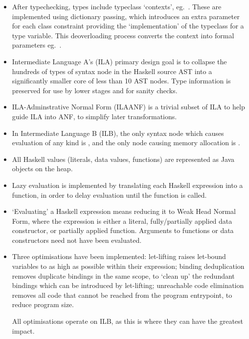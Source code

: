 \documentclass[dissertation.tex]{subfiles}
\begin{document}
{\begin{itemize}
{        Typeclasses provide a way to implement strongly-typed ad-hoc overloading, allowing for the types of overloaded expressions to be known at compile time.
    }
    \item
    {
        After typechecking, types include typeclass `contexts', eg.\ . These are implemented using dictionary passing, which introduces an extra parameter for each class constraint providing the `implementation' of the typeclass for a type variable. This deoverloading process converts the context into formal parameters eg.\ .
    }
    \item
    {
        Intermediate Language A's (ILA) primary design goal is to collapse the hundreds of types of syntax node in the Haskell source AST into a significantly smaller core of less than 10 AST nodes. Type information is preserved for use by lower stages and for sanity checks.
    }
    \item
    {
        ILA-Adminstrative Normal Form (ILAANF) is a trivial subset of ILA to help guide ILA into ANF, to simplify later transformations.
    }
    \item
    {
        In Intermediate Language B (ILB), the only syntax node which causes evaluation of any kind is , and the only node causing memory allocation is .
    }
    \item All Haskell values (literals, data values, functions) are represented as Java objects on the heap.
    \item
    {
        Lazy evaluation is implemented by translating each Haskell expression into a function, in order to delay evaluation until the function is called.
    }
    \item
    {
        `Evaluating' a Haskell expression means reducing it to Weak Head Normal Form, where the expression is either a literal, fully/partially applied data constructor, or partially applied function. Arguments to functions or data constructors need not have been evaluated.
    }
    \item
    {
        Three optimisations have been implemented: let-lifting raises let-bound variables to as high as possible within their expression; binding deduplication removes duplicate bindings in the same scope, to `clean up' the redundant bindings which can be introduced by let-lifting; unreachable code elimination removes all code that cannot be reached from the program entrypoint, to reduce program size.

        All optimisations operate on ILB, as this is where they can have the greatest impact.
    }
    \end{itemize}
}
\end{document}
